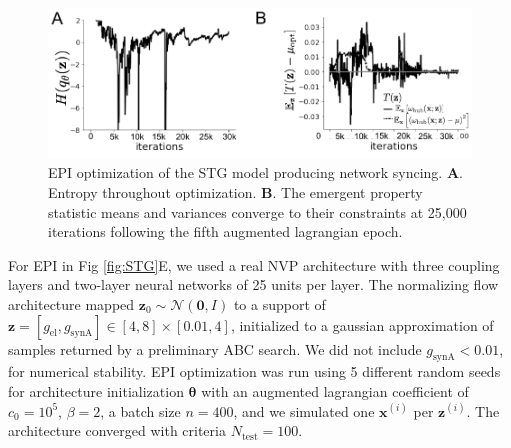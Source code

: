 \documentclass[11pt]{article}
\begin{document}
\begin{figure}
\begin{center}
\includegraphics[scale=0.8]{figures/figSTG1/figSTG1.pdf}
\end{center}
\caption{EPI optimization of the STG model producing network syncing. 
\textbf{A}. Entropy throughout optimization. 
\textbf{B}. The emergent property statistic means and variances converge to their constraints at 25,000 iterations following the fifth augmented lagrangian epoch.}
\label{fig:STG1}
\end{figure}

For EPI in Fig \ref{fig:STG}E, we used a real NVP architecture with three coupling layers and two-layer neural networks of 25 units per layer.
The normalizing flow architecture mapped $\mathbf{z}_0 \sim \mathcal{N}(\mathbf{0}, I)$ to a support of $\mathbf{z} = [g_{\text{el}}, g_{\text{synA}}] \in [4,8] \times [0.01,4]$, initialized to a gaussian approximation of samples returned by a preliminary ABC search.
We did not include $g_{\text{synA}} < 0.01$, for numerical stability.
EPI optimization was run using 5 different random seeds for architecture initialization $\bm{\theta}$ with an augmented lagrangian coefficient of $c_0 = 10^{5}$, $\beta = 2$, a batch size $n=400$, and we simulated one $\mathbf{x}^{(i)}$ per $\mathbf{z}^{(i)}$.
The architecture converged with criteria $N_{\text{test}} = 100$.
\end{document}
